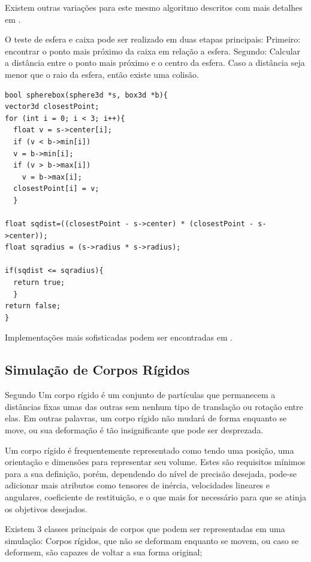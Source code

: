 Existem outras variações para este mesmo algoritmo descritos com mais detalhes
em .


O teste de esfera e caixa pode ser realizado em duas etapas principais:
Primeiro: encontrar o ponto mais próximo da caixa em relação a esfera.
Segundo: Calcular a distância entre o ponto mais próximo e o centro da esfera.
Caso a distância seja menor que o raio da esfera, então existe uma colisão.

\begin{lstlisting}[frame=single,caption=Colisão entre esfera e caixa\label{code:collisionSphereBox}]
bool spherebox(sphere3d *s, box3d *b){
vector3d closestPoint;
for (int i = 0; i < 3; i++){
  float v = s->center[i];
  if (v < b->min[i])
  v = b->min[i];  
  if (v > b->max[i])
    v = b->max[i];
  closestPoint[i] = v;
  }
  
float sqdist=((closestPoint - s->center) * (closestPoint - s->center));
float sqradius = (s->radius * s->radius);

if(sqdist <= sqradius){
  return true;
  }
return false;
}
\end{lstlisting}

Implementações mais sofisticadas podem ser encontradas em .

\subsection{Simulação de Corpos Rígidos}
Segundo  Um corpo rígido é um conjunto de partículas  que permanecem a distâncias fixas umas das outras  sem nenhum tipo de translação ou rotação entre elas. Em outras palavras,  um corpo rígido não mudará de forma enquanto se move, ou sua deformação é tão insignificante que pode ser desprezada.

Um corpo rígido é  frequentemente representado como tendo uma posição, uma orientação  e  dimensões para representar seu volume. Estes são requisitos mínimos para a  sua definição, porém, dependendo do nível de precisão desejada, pode-se adicionar mais atributos como tensores de inércia, velocidades lineares e angulares, coeficiente de restituição, e o que mais for necessário para que se atinja os objetivos desejados.

Existem 3 classes principais de corpos que podem ser representadas em uma simulação:
Corpos rígidos, que não se deformam  enquanto se movem, ou caso se deformem, são capazes de voltar a sua forma original;


